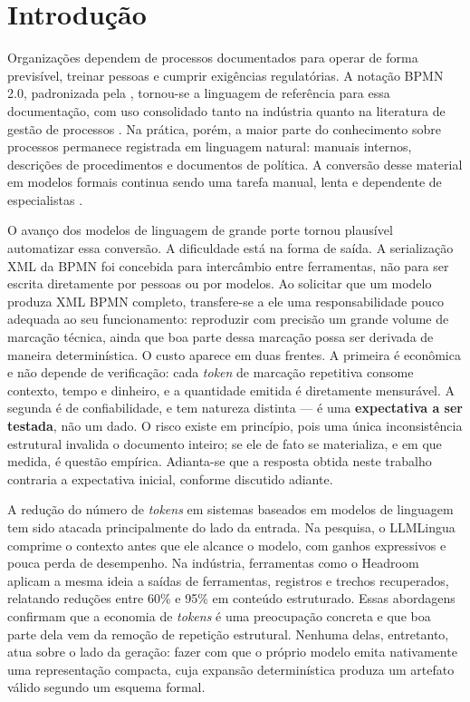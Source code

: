 \chapter{Introdução}
\label{cap:introducao}

Organizações dependem de processos documentados para operar de forma previsível, treinar pessoas e cumprir exigências regulatórias. A notação BPMN 2.0, padronizada pela , tornou-se a linguagem de referência para essa documentação, com uso consolidado tanto na indústria quanto na literatura de gestão de processos \cite{weske2019business, dumas2018fundamentals}. Na prática, porém, a maior parte do conhecimento sobre processos permanece registrada em linguagem natural: manuais internos, descrições de procedimentos e documentos de política. A conversão desse material em modelos formais continua sendo uma tarefa manual, lenta e dependente de especialistas \cite{friedrich2011process, vanderaa2018challenges}.

O avanço dos modelos de linguagem de grande porte \cite{vaswani2017attention, brown2020language} tornou plausível automatizar essa conversão. A dificuldade está na forma de saída. A serialização XML da BPMN foi concebida para intercâmbio entre ferramentas, não para ser escrita diretamente por pessoas ou por modelos. Ao solicitar que um modelo produza XML BPMN completo, transfere-se a ele uma responsabilidade pouco adequada ao seu funcionamento: reproduzir com precisão um grande volume de marcação técnica, ainda que boa parte dessa marcação possa ser derivada de maneira determinística. O custo aparece em duas frentes. A primeira é econômica e não depende de verificação: cada \textit{token} de marcação repetitiva consome contexto, tempo e dinheiro, e a quantidade emitida é diretamente mensurável. A segunda é de confiabilidade, e tem natureza distinta --- é uma \textbf{expectativa a ser testada}, não um dado. O risco existe em princípio, pois uma única inconsistência estrutural invalida o documento inteiro; se ele de fato se materializa, e em que medida, é questão empírica. Adianta-se que a resposta obtida neste trabalho contraria a expectativa inicial, conforme discutido adiante.

A redução do número de \textit{tokens} em sistemas baseados em modelos de linguagem tem sido atacada principalmente do lado da entrada. Na pesquisa, o LLMLingua \cite{jiang2023llmlingua} comprime o contexto antes que ele alcance o modelo, com ganhos expressivos e pouca perda de desempenho. Na indústria, ferramentas como o Headroom \cite{headroom2026} aplicam a mesma ideia a saídas de ferramentas, registros e trechos recuperados, relatando reduções entre 60\% e 95\% em conteúdo estruturado. Essas abordagens confirmam que a economia de \textit{tokens} é uma preocupação concreta e que boa parte dela vem da remoção de repetição estrutural. Nenhuma delas, entretanto, atua sobre o lado da geração: fazer com que o próprio modelo emita nativamente uma representação compacta, cuja expansão determinística produza um artefato válido segundo um esquema formal.

